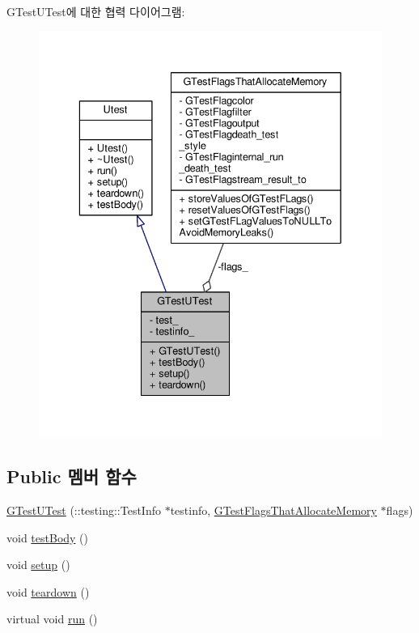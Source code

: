 G\+Test\+U\+Test에 대한 협력 다이어그램\+:
\nopagebreak
\begin{figure}[H]
\begin{center}
\leavevmode
\includegraphics[width=336pt]{class_g_test_u_test__coll__graph}
\end{center}
\end{figure}
\subsection*{Public 멤버 함수}
\begin{DoxyCompactItemize}
\item 
\hyperlink{class_g_test_u_test_ae77640af9a6b2cab961c9357c43add91}{G\+Test\+U\+Test} (\+::testing\+::\+Test\+Info $\ast$testinfo, \hyperlink{class_g_test_flags_that_allocate_memory}{G\+Test\+Flags\+That\+Allocate\+Memory} $\ast$flags)
\item 
void \hyperlink{class_g_test_u_test_ae62cdb23024dce723301fba2479b52a4}{test\+Body} ()
\item 
void \hyperlink{class_g_test_u_test_a4fc01d736fe50cf5b977f755b675f11d}{setup} ()
\item 
void \hyperlink{class_g_test_u_test_a4adab6322a0276f34a7d656d49fc865c}{teardown} ()
\item 
virtual void \hyperlink{class_utest_a13a43e6d814de94978c515cb084873b1}{run} ()
\end{DoxyCompactItemize}
